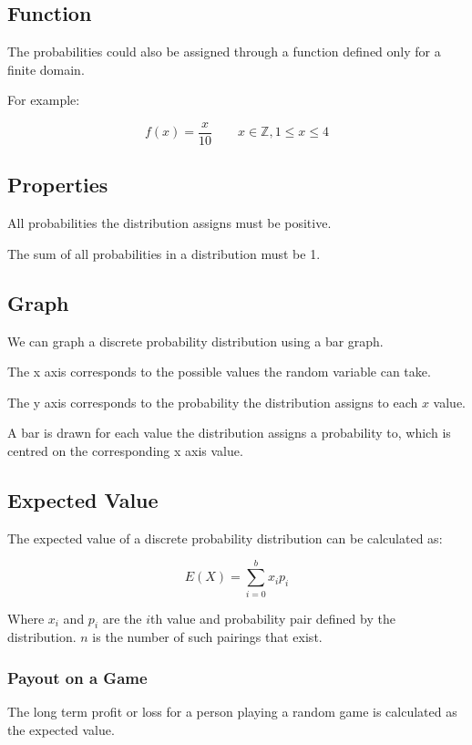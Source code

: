 \documentclass[a4paper,11pt]{article}
\begin{document}
\subsection{Function}

The probabilities could also be assigned through a function defined only for
a finite domain.

For example:

$$
f(x) = \frac{x}{10} \qquad x \in \mathbb{Z}, 1 \leq x \leq 4
$$


\subsection{Properties}

All probabilities the distribution assigns must be positive.

The sum of all probabilities in a distribution must be 1.


\subsection{Graph}

We can graph a discrete probability distribution using a bar graph.

The x axis corresponds to the possible values the random variable can take.

The y axis corresponds to the probability the distribution assigns to each $x$
value.

A bar is drawn for each value the distribution assigns a probability to, which
is centred on the corresponding x axis value.


\subsection{Expected Value}

The expected value of a discrete probability distribution can be calculated as:

$$
E(X) = \sum^{b}_{i = 0} x_i p_i
$$

Where $x_i$ and $p_i$ are the $i$th value and probability pair defined by the
distribution. $n$ is the number of such pairings that exist.


\subsubsection{Payout on a Game}

The long term profit or loss for a person playing a random game is calculated
as the expected value.
\end{document}
